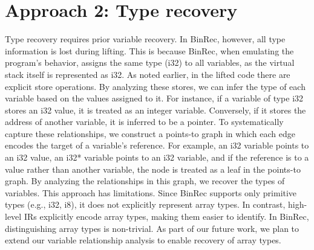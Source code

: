 \section{Approach 2: Type recovery}
Type recovery requires prior variable recovery. In BinRec, however, all type
information is lost during lifting. This is because BinRec, when emulating the
program’s behavior, assigns the same type (i32) to all variables, as the
virtual stack itself is represented as i32.
As noted earlier, in the lifted code there are explicit store operations. By
analyzing these stores, we can infer the type of each variable based on the
values assigned to it. For instance, if a variable of type i32 stores an i32
value, it is treated as an integer variable. Conversely, if it stores the
address of another variable, it is inferred to be a pointer.
To systematically capture these relationships, we construct a points-to graph
in which each edge encodes the target of a variable’s reference. For example,
an i32 variable points to an i32 value, an i32* variable points to an i32
variable, and if the reference is to a value rather than another variable, the
node is treated as a leaf in the points-to graph. By analyzing the
relationships in this graph, we recover the types of variables.
This approach has limitations. Since BinRec supports only primitive types
(e.g., i32, i8), it does not explicitly represent array types. In contrast,
high-level IRs explicitly encode array types, making them easier to identify.
In BinRec, distinguishing array types is non-trivial. As part of our future
work, we plan to extend our variable relationship analysis to enable recovery
of array types.
